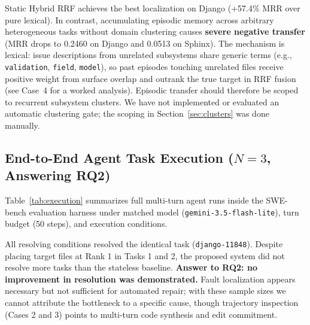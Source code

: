 \documentclass[conference]{IEEEtran}
\begin{document}
Static Hybrid RRF achieves the best localization on Django (+57.4\% MRR over pure lexical). In contrast, accumulating episodic memory across arbitrary heterogeneous tasks without domain clustering causes \textbf{severe negative transfer} (MRR drops to 0.2460 on Django and 0.0513 on Sphinx). The mechanism is lexical: issue descriptions from unrelated subsystems share generic terms (e.g., \texttt{validation}, \texttt{field}, \texttt{model}), so past episodes touching unrelated files receive positive weight from surface overlap and outrank the true target in RRF fusion (see Case~4 for a worked analysis). Episodic transfer should therefore be scoped to recurrent subsystem clusters. We have not implemented or evaluated an automatic clustering gate; the scoping in Section~\ref{sec:clusters} was done manually.

\subsection{End-to-End Agent Task Execution ($N=3$, Answering RQ2)}
Table~\ref{tab:execution} summarizes full multi-turn agent runs inside the SWE-bench evaluation harness under matched model (\texttt{gemini-3.5-flash-lite}), turn budget (50 steps), and execution conditions.

\begin{table}[!t]
\caption{Master Execution Results Table ($N=3$ Sequential Tasks)}
\label{tab:execution}
\centering
\setlength{\tabcolsep}{3.5pt}
\end{table}

All resolving conditions resolved the identical task (\texttt{django-11848}). Despite placing target files at Rank 1 in Tasks 1 and 2, the proposed system did not resolve more tasks than the stateless baseline. \textbf{Answer to RQ2: no improvement in resolution was demonstrated.} Fault localization appears necessary but not sufficient for automated repair; with these sample sizes we cannot attribute the bottleneck to a specific cause, though trajectory inspection (Cases 2 and 3) points to multi-turn code synthesis and edit commitment.
\end{document}
